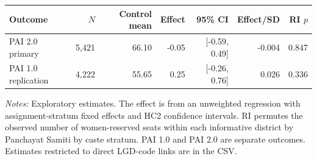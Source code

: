\begin{tabular}{lrrrrrr}
\toprule
Outcome & $N$ & Control mean & Effect & 95\% CI & Effect/SD & RI $p$ \\
\midrule
PAI 2.0 primary & 5,421 & 66.10 & -0.05 & [-0.59, 0.49] & -0.004 & 0.847 \\
PAI 1.0 replication & 4,222 & 55.65 & 0.25 & [-0.26, 0.76] & 0.026 & 0.336 \\
\bottomrule
\end{tabular}
\parbox{\linewidth}{\scriptsize \emph{Notes:} Exploratory estimates. The effect is from an unweighted regression with assignment-stratum fixed effects and HC2 confidence intervals. RI permutes the observed number of women-reserved seats within each informative district by Panchayat Samiti by caste stratum. PAI 1.0 and PAI 2.0 are separate outcomes. Estimates restricted to direct LGD-code links are in the CSV.}
